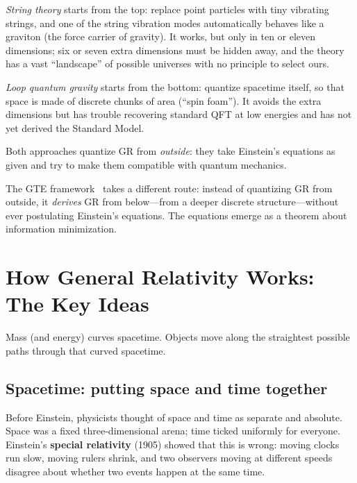 \documentclass[11pt,a4paper]{article}
\newcommand{\term}[1]{\textbf{#1}}
\begin{document}
\medskip
\noindent\textit{String theory} starts from the top: replace point particles with tiny
vibrating strings, and one of the string vibration modes automatically behaves like a
graviton (the force carrier of gravity).  It works, but only in ten or eleven
dimensions; six or seven extra dimensions must be hidden away, and the theory has a
vast ``landscape'' of possible universes with no principle to select ours.

\medskip
\noindent\textit{Loop quantum gravity} starts from the bottom: quantize spacetime
itself, so that space is made of discrete chunks of area (``spin foam'').  It
avoids the extra dimensions but has trouble recovering standard QFT at low energies
and has not yet derived the Standard Model.

Both approaches quantize GR from \emph{outside}: they take Einstein's equations as
given and try to make them compatible with quantum mechanics.

\medskip
\begin{tcolorbox}[colback=boxgreen,colframe=green!50!black,title=The GTE approach]
The GTE framework~\cite{SpivackGTECompleteFramework} takes a different route: instead of quantizing GR from outside,
it \emph{derives} GR from below---from a deeper discrete structure---without
ever postulating Einstein's equations.
The equations emerge as a theorem about information minimization.
\end{tcolorbox}

\section{How General Relativity Works: The Key Ideas}

\begin{tcolorbox}[colback=boxblue,colframe=blue!40!black,title=The two-sentence summary of GR]
Mass (and energy) curves spacetime.
Objects move along the straightest possible paths through that curved spacetime.
\end{tcolorbox}

\subsection{Spacetime: putting space and time together}

Before Einstein, physicists thought of space and time as separate and absolute.
Space was a fixed three-dimensional arena; time ticked uniformly for everyone.
Einstein's \term{special relativity} (1905) showed that this is wrong: moving clocks
run slow, moving rulers shrink, and two observers moving at different speeds disagree
about whether two events happen at the same time.
\end{document}
